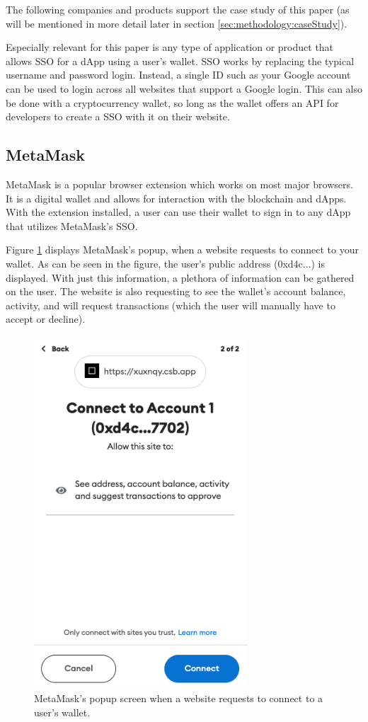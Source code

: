 The following companies and products support the case study  of this paper (as will be mentioned in more detail later in section \ref{sec:methodology:caseStudy}).

Especially relevant for this paper is any type of application or product that allows SSO for a dApp using a user's wallet. SSO works by replacing the typical username and password login. Instead, a single ID such as your Google account can be used to login across all websites that support a Google login. This can also be done with a cryptocurrency wallet, so long as the wallet offers an API for developers to create a SSO with it on their website.

\subsection{MetaMask}
\label{sec:sota:metaMask}
MetaMask is a popular browser extension which works on most major browsers. It is a digital wallet and allows for interaction with the blockchain and dApps. With the extension installed, a user can use their wallet to sign in to any dApp that utilizes MetaMask's SSO. \cite{metaMask}

Figure \ref{fig:metamaskPopup} displays MetaMask's popup, when a website requests to connect to your wallet. As can be seen in the figure, the user's public address (0xd4c...) is displayed. With just this information, a plethora of information can be gathered on the user. The website is also requesting to see the wallet's account balance, activity, and will request transactions (which the user will manually have to accept or decline).

\begin{figure}[t]
\includegraphics[width=8cm]{./gfx/metamaskPopup.png}
\centering
\caption{MetaMask's popup screen when a website requests to connect to a user's wallet.}
\label{fig:metamaskPopup}
\end{figure}



